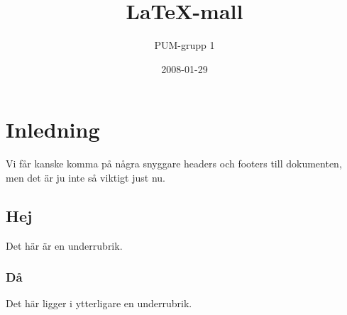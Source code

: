 

\ifpdf
\else
\fi

\title{LaTeX-mall}
\author{PUM-grupp 1}
\date{2008-01-29}



\maketitle\thispagestyle{empty}

\newpage

\setcounter{tocdepth}{2}
\tableofcontents
\newpage

\section{Inledning}

Vi får kanske komma på några snyggare headers och footers till dokumenten, men det är ju inte så viktigt just nu.

\subsection{Hej}

Det här är en underrubrik.

\subsubsection{Då}

Det här ligger i ytterligare en underrubrik.


